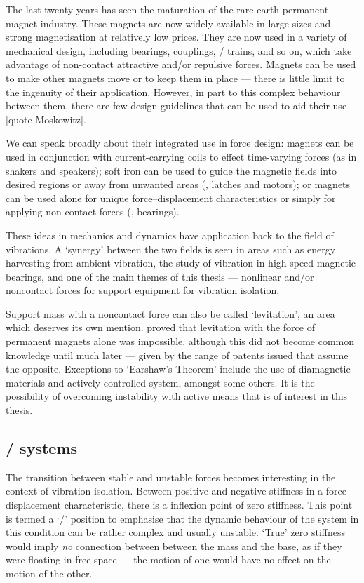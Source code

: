 The last twenty years has seen the maturation of the rare earth permanent
magnet industry. These magnets are now widely available in large sizes and
strong magnetisation at relatively low prices. They are now used in a variety
of mechanical design, including bearings, couplings, \maglev/ trains, and so
on, which take advantage of non-contact attractive and/or repulsive forces.
Magnets can be used to make other magnets move or to keep them in place —
there is little limit to the ingenuity of their application. However, in part
to this complex behaviour between them, there are few design guidelines that
can be used to aid their use [quote Moskowitz].

We can speak broadly about their integrated use in force design: magnets can
be used in conjunction with current-carrying coils to effect time-varying
forces (as in shakers and speakers); soft iron can be used to guide the
magnetic fields into desired regions or away from unwanted areas (\eg, latches
and motors); or magnets can be used alone for unique force--displacement
characteristics or simply for applying non-contact forces (\eg, bearings).

These ideas in mechanics and dynamics have application back to the field of
vibrations. A `synergy' between the two fields is seen in areas such as energy
harvesting from ambient vibration, the study of vibration in high-speed
magnetic bearings, and one of the main themes of this thesis — nonlinear
and/or noncontact forces for support equipment for vibration isolation.

Support mass with a noncontact force can also be called `levitation', an area
which deserves its own mention. \textcite{earnshaw1842} proved that levitation
with the force of permanent magnets alone was impossible, although this did
not become common knowledge  until much later — given
by the range of patents issued that assume the opposite. Exceptions to
`Earshaw's Theorem' include the use of diamagnetic materials and
actively-controlled system, amongst some others. It is the possibility of
overcoming instability with active means that is of interest in this thesis.

\subsection{\QZS/ systems}

The transition between stable and unstable forces becomes interesting in the
context of vibration isolation. Between positive and negative stiffness in a
force--displacement characteristic, there is a inflexion point of zero
stiffness. This point is termed a `\qzs/' position to emphasise that the
dynamic behaviour of the system in this condition can be rather complex and
usually unstable. `True' zero stiffness would imply \emph{no} connection
between between the mass and the base, as if they were floating in free space
— the motion of one would have no effect on the motion of the other.


